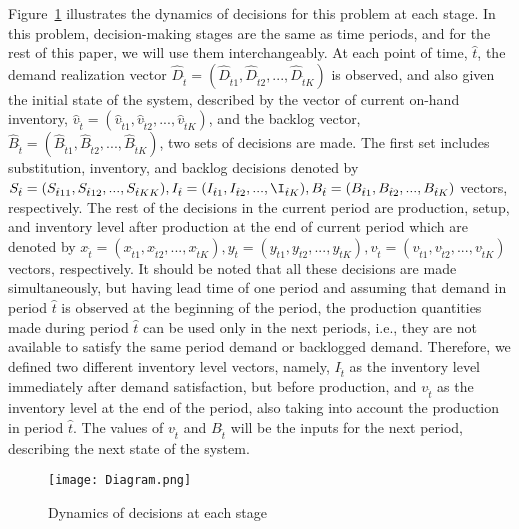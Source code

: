 \documentclass[10pt]{article}
\newcommand{\ti}{t} %
\newcommand{\Ka}{K}
\newcommand{\Bi}{B} %
\newcommand{\Vi}{v} %
\newcommand{\Es}{S} %
\newcommand{\InvPos}{inventory level after production }
\newcommand{\tAct}{\hat{\ti}} %
\begin{document}
Figure~\ref{MultistageDynamics} illustrates the dynamics of decisions for this problem at each stage. In this problem, decision-making stages are the same as time periods, and for the rest of this paper, we will use them interchangeably. 
At each point of time, $\tAct$, the demand realization vector $\hat{D}_{\tAct} =(\hat{D}_{\tAct 1}, \hat{D}_{\tAct 2},..., \hat{D}_{\tAct \Ka})$ is observed, and also given the initial state of the system, described by the vector of current on-hand inventory, $\hat{\Vi}_{\tAct} =(\hat{\Vi}_{\tAct 1}, \hat{\Vi}_{\tAct 2},..., \hat{\Vi}_{\tAct \Ka})$, and the backlog vector, $\hat{\Bi}_{\tAct}=(\hat{\Bi}_{\tAct 1}, \hat{\Bi}_{\tAct 2},..., \hat{\Bi}_{\tAct \Ka})$, two sets of decisions are made. The first set includes substitution, inventory, and backlog decisions denoted by $\Es_{\tAct}= ({\Es}_{\tAct 11}, {\Es}_{\tAct 12},..., {\Es}_{\tAct \Ka \Ka}), I_{\tAct} = ({I}_{\tAct 1}, {I}_{\tAct 2},..., {\I}_{\tAct \Ka}), \Bi_{\tAct} =({\Bi}_{\tAct 1}, {\Bi}_{\tAct 2},..., {\Bi}_{\tAct \Ka})$ vectors, respectively. 
The rest of the decisions in the current period are production, setup, and \InvPos at the end of current period which are denoted by $x_{\tAct} = (x_{\tAct 1}, x_{\tAct 2},..., x_{\tAct \Ka}), y_{\tAct} = ({y}_{\tAct 1}, {y}_{\tAct 2},..., {y}_{\tAct \Ka}), \Vi_{\tAct} = ({\Vi}_{\tAct 1}, {\Vi}_{\tAct 2},..., {\Vi}_{\tAct \Ka})$ vectors, respectively. 
It should be noted that all these decisions are made simultaneously, but having lead time of one period and assuming that demand in period $\tAct$ is observed at the beginning of the period, the production quantities made during period $\tAct$ can be used only in the next periods, i.e., they are not available to satisfy the same period demand or backlogged demand. Therefore, we defined two different inventory level vectors, namely, $I_{\tAct}$ as the inventory level immediately after demand satisfaction, but before production, and $\Vi_{\tAct}$ as the inventory level at the end of the period, also taking into account the production in period $\tAct$. 
The values of $\Vi_{\tAct}$ and $\Bi_{\tAct}$ will be the inputs for the next period, describing the next state of the system.
\begin{figure}[!h]
\begin{center}
\texttt{[image: Diagram.png]}
\caption{Dynamics of decisions at each stage} 
\label{MultistageDynamics}
\end{center}
\end{figure}
\end{document}
